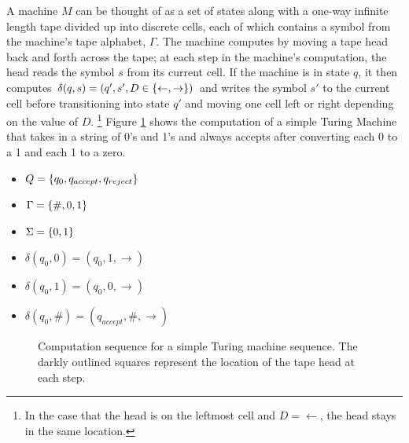 \documentclass{article}
\newcommand{\blank}{\#}
\begin{document}
A machine $M$ can be thought of as a set of states along with a
one-way infinite length tape divided up into discrete cells, each of
which contains a symbol from the machine's tape alphabet, $\Gamma$.
The machine computes by moving a tape head back and forth across the
tape; at each step in the machine's computation, the head reads the
symbol $s$ from its current cell.  If the machine is in state $q$, it
then computes $\delta(q, s) = (q', s', D \in \{\leftarrow,
  \rightarrow\})$ and writes the symbol $s'$ to the current cell before
transitioning into state $q'$ and moving one cell left or right
depending on the value of $D$. \footnote[2]{In the case that the head
  is on the leftmost cell and $D = \leftarrow$, the head stays in the
  same location.}  Figure \ref{turing-example} shows the computation of a
simple Turing Machine that takes in a string of 0's and 1's and always
accepts after converting each 0 to a 1 and each 1 to a zero.

\begin{itemize}
\item $Q = \{q_0, q_{accept}, q_{reject}\}$
\item $\Gamma = \set{\blank, 0, 1}$
\item $\Sigma = \{0,1\}$
\item $\delta(q_0, 0) = (q_0, 1, \rightarrow)$
\item $\delta(q_0, 1) = (q_0, 0, \rightarrow)$
\item $\delta(q_0, \blank) = (q_{accept}, \blank, \rightarrow)$
\end{itemize}

\begin{figure}
  \caption{Computation sequence for a simple Turing machine sequence.
    The darkly outlined squares represent the location of the tape
    head at each step.}
  \label{turing-example}
\end{figure}
\end{document}
